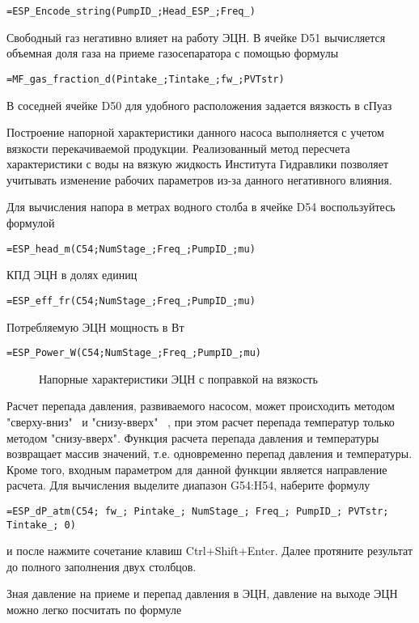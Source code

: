 { \small  \texttt{=ESP\_Encode\_string(PumpID\_;Head\_ESP\_;Freq\_)}}

Свободный газ негативно влияет на работу ЭЦН. В ячейке D51 вычисляется объемная доля газа на приеме газосепаратора с помощью формулы

{ \small  \texttt{=MF\_gas\_fraction\_d(Pintake\_;Tintake\_;fw\_;PVTstr)}}
 
В соседней ячейке D50 для удобного расположения задается вязкость в сПуаз

Построение напорной характеристики данного насоса выполняется с учетом вязкости перекачиваемой продукции. Реализованный метод пересчета характеристики с воды на вязкую жидкость Института Гидравлики позволяет учитывать изменение рабочих параметров из-за данного негативного влияния.

Для вычисления напора в метрах водного столба в ячейке D54 воспользуйтесь формулой

{ \small  \texttt{=ESP\_head\_m(C54;NumStage\_;Freq\_;PumpID\_;mu)}}

КПД ЭЦН в долях единиц 

{ \small  \texttt{=ESP\_eff\_fr(C54;NumStage\_;Freq\_;PumpID\_;mu)}}

Потребляемую ЭЦН мощность в Вт

{ \small  \texttt{=ESP\_Power\_W(C54;NumStage\_;Freq\_;PumpID\_;mu)}}

\begin{figure}[h!]
	\center{\texttt{[image: Ex70\_3]}}
	\caption{Напорные характеристики ЭЦН с поправкой на вязкость}
	\label{ris:Ex70_3}
\end{figure}

Расчет перепада давления, развиваемого насосом, может происходить методом "сверху-вниз" \  и "снизу-вверх" \ , при этом расчет перепада температур только методом "снизу-вверх". Функция расчета перепада давления и температуры возвращает массив значений, т.е. одновременно перепад давления и температуры. Кроме того, входным параметром для данной функции является направление расчета. Для вычисления выделите диапазон G54:H54, наберите формулу

{ \small  \texttt{=ESP\_dP\_atm(C54; fw\_; Pintake\_; NumStage\_; Freq\_; PumpID\_; PVTstr; Tintake\_; 0)}}

и после нажмите сочетание клавиш  Ctrl+Shift+Enter. Далее протяните результат до полного заполнения двух столбцов.

Зная давление на приеме и перепад давления в ЭЦН, давление на выходе ЭЦН можно легко посчитать по формуле

